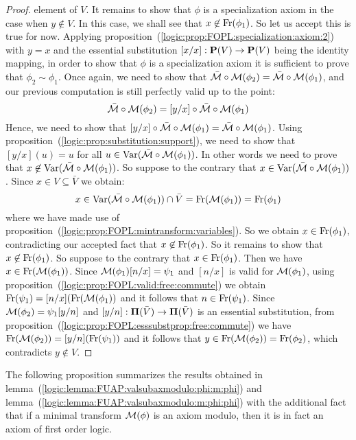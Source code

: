 \begin{proof}
element of $V$. It remains to show that $\phi$ is a specialization
axiom in the case when $y\not\in V$. In this case, we shall see that
$x\not\in\mbox{\rm Fr}(\phi_{1})$. So let us accept this is true for now.
Applying proposition~(\ref{logic:prop:FOPL:specialization:axiom:2})
with $y=x$ and the essential substitution $[x/x]:\mbox{${\bf P}(V)$}\to\mbox{${\bf P}(V)$}$ being
the identity mapping, in order to show that $\phi$ is a
specialization axiom it is sufficient to prove that
$\phi_{2}\sim\phi_{1}$. Once again, we need to show that $\bar{\cal
M}\circ{\cal M}(\phi_{2})=\bar{\cal M}\circ{\cal M}(\phi_{1})$, and
our previous computation is still perfectly valid up to the point:
    \[
    \bar{\cal M}\circ{\cal M}(\phi_{2})=[y/x]\circ\bar{\cal M}\circ{\cal M}(\phi_{1})
    \]
Hence, we need to show that $[y/x]\circ\bar{\cal M}\circ{\cal
M}(\phi_{1})=\bar{\cal M}\circ{\cal M}(\phi_{1})$. Using
proposition~(\ref{logic:prop:substitution:support}), we need to show
that $[y/x](u)=u$ for all $u\in\mbox{\rm Var}(\bar{\cal M}\circ{\cal
M}(\phi_{1}))$. In other words we need to prove that
$x\not\in\mbox{\rm Var}(\bar{\cal M}\circ{\cal M}(\phi_{1}))$. So suppose to
the contrary that $x\in\mbox{\rm Var}(\bar{\cal M}\circ{\cal M}(\phi_{1}))$.
Since $x\in V\subseteq\bar{V}$ we obtain:
    \[
    x\in\mbox{\rm Var}(\bar{\cal M}\circ{\cal
    M}(\phi_{1}))\cap\bar{V}=\mbox{\rm Fr}({\cal
    M}(\phi_{1}))=\mbox{\rm Fr}(\phi_{1})
    \]
where we have made use of
proposition~(\ref{logic:prop:FOPL:mintransform:variables}). So we
obtain $x\in\mbox{\rm Fr}(\phi_{1})$, contradicting our accepted fact that
$x\not\in\mbox{\rm Fr}(\phi_{1})$. So it remains to show that
$x\not\in\mbox{\rm Fr}(\phi_{1})$. So suppose to the contrary that
$x\in\mbox{\rm Fr}(\phi_{1})$. Then we have $x\in\mbox{\rm Fr}({\cal M}(\phi_{1}))$.
Since ${\cal M}(\phi_{1})[n/x]=\psi_{1}$ and $[n/x]$ is valid for
${\cal M}(\phi_{1})$, using
proposition~(\ref{logic:prop:FOPL:valid:free:commute}) we obtain
$\mbox{\rm Fr}(\psi_{1})=[n/x](\mbox{\rm Fr}({\cal M}(\phi_{1}))$ and it follows
that $n\in\mbox{\rm Fr}(\psi_{1})$. Since ${\cal M}(\phi_{2})=\psi_{1}[y/n]$
and $[y/n]:\mbox{${\bf\Pi}(\bar{V})$}\to\mbox{${\bf\Pi}(\bar{V})$}$ is an essential substitution, from
proposition~(\ref{logic:prop:FOPL:esssubstprop:free:commute}) we
have $\mbox{\rm Fr}({\cal M}(\phi_{2}))=[y/n](\mbox{\rm Fr}(\psi_{1}))$ and it
follows that $y\in\mbox{\rm Fr}({\cal M}(\phi_{2}))=\mbox{\rm Fr}(\phi_{2})$, which
contradicts $y\not\in V$.
\end{proof}

The following proposition summarizes the results obtained in
lemma~(\ref{logic:lemma:FUAP:valsubaxmodulo:phi:m:phi}) and
lemma~(\ref{logic:lemma:FUAP:valsubaxmodulo:m:phi:phi}) with the
additional fact that if a minimal transform ${\cal M}(\phi)$ is an
axiom modulo, then it is in fact an axiom of first order logic.

